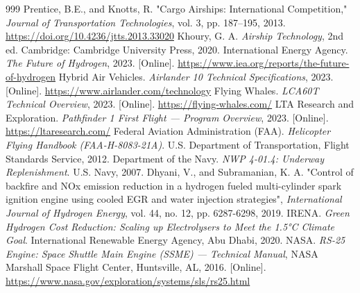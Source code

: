 \documentclass[aerospace,article,submit,pdftex,moreauthors]{Definitions/mdpi}
\begin{document}
\begin{thebibliography}{999}
 Prentice, B.E., and Knotts, R. "Cargo Airships: International Competition," \textit{Journal of Transportation Technologies}, vol. 3, pp. 187--195, 2013. \url{https://doi.org/10.4236/jtts.2013.33020}
 Khoury, G. A. \textit{Airship Technology}, 2nd ed. Cambridge: Cambridge University Press, 2020.
 International Energy Agency. \textit{The Future of Hydrogen}, 2023. [Online]. \url{https://www.iea.org/reports/the-future-of-hydrogen}
 Hybrid Air Vehicles. \textit{Airlander 10 Technical Specifications}, 2023. [Online]. \url{https://www.airlander.com/technology}
 Flying Whales. \textit{LCA60T Technical Overview}, 2023. [Online]. \url{https://flying-whales.com/}
 LTA Research and Exploration. \textit{Pathfinder 1 First Flight — Program Overview}, 2023. [Online]. \url{https://ltaresearch.com/}
 Federal Aviation Administration (FAA). \textit{Helicopter Flying Handbook (FAA-H-8083-21A)}. U.S. Department of Transportation, Flight Standards Service, 2012.
 Department of the Navy. \textit{NWP 4-01.4: Underway Replenishment}. U.S. Navy, 2007.
 Dhyani, V., and Subramanian, K. A. "Control of backfire and NOx emission reduction in a hydrogen fueled multi-cylinder spark ignition engine using cooled EGR and water injection strategies", \textit{International Journal of Hydrogen Energy}, vol. 44, no. 12, pp. 6287-6298, 2019.
 IRENA. \textit{Green Hydrogen Cost Reduction: Scaling up Electrolysers to Meet the 1.5°C Climate Goal}. International Renewable Energy Agency, Abu Dhabi, 2020.
 NASA. \textit{RS-25 Engine: Space Shuttle Main Engine (SSME) — Technical Manual}, NASA Marshall Space Flight Center, Huntsville, AL, 2016. [Online]. \url{https://www.nasa.gov/exploration/systems/sls/rs25.html}
\end{thebibliography}
\end{document}
